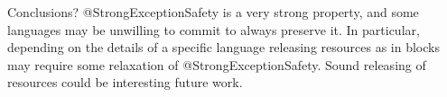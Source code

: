 Conclusions?
@StrongExceptionSafety is 
a very strong property,
and some languages may be unwilling to commit to always preserve it.
In particular, depending on the details of a specific language
 releasing resources as in \Q@finally@ blocks may require
some relaxation of @StrongExceptionSafety. Sound releasing of resources could be interesting
future work.



%
%
